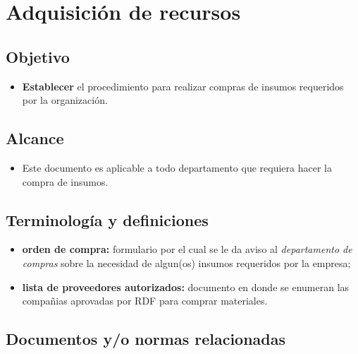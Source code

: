 \renewcommand{\MayorVer}{2}
\renewcommand{\MenorVer}{1}
\renewcommand{\Codigo}{BPD-10-PRO}
\renewcommand{\FechaPub}{2023--01}
\renewcommand{\Titulo}{Adquisición de recursos}
\section{\Titulo}

\subsection{Objetivo}

\begin{itemize}
	\item \textbf{Establecer} el procedimiento para realizar compras de insumos requeridos por la organización.
\end{itemize}

\subsection{Alcance}

\begin{itemize}
	\item Este documento es aplicable a todo departamento que requiera hacer la compra de insumos.
\end{itemize}

\subsection{Terminología y definiciones}

\begin{itemize}
	\item \textbf{orden de compra:} formulario por el cual se le da aviso al \emph{departamento de compras} sobre la necesidad de algun(os) insumos requeridos por la empresa;
	\item \textbf{lista de proveedores autorizados:} documento en donde se enumeran las compañias aprovadas por RDF para comprar materiales.
\end{itemize}

\subsection{Documentos y/o normas relacionadas}


